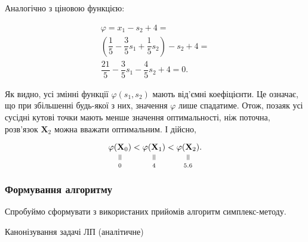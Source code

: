 \documentclass[\main/book.tex]{subfiles}
\begin{document}
Аналогічно з ціновою функцією:

\[
\begin{split}
 \varphi = x_1 - s_2 + 4 = \\
 \left( \dfrac{1}{5} - \dfrac{3}{5}s_1 + \dfrac{1}{5}s_2 \right) - s_2 + 4 = \\
 \dfrac{21}{5} - \dfrac{3}{5} s_1 - \dfrac{4}{5} s_2 + 4 = 0
 \text{.}
\end{split}
\]

Як видно, усі змінні функції $\varphi(s_1, s_2)$ мають від'ємні коефіцієнти. Це означає, що при збільшенні будь-якої з них, значення $\varphi$ лише спадатиме. Отож, позаяк усі сусідні кутові точки мають менше значення оптимальності, ніж поточна, розв'язок $\mathbf{X}_2$ можна вважати оптимальним. І дійсно,

\[
 \equalto{\varphi(\mathbf{X}_0)}{0} <
 \equalto{\varphi(\mathbf{X}_1)}{4} <
 \equalto{\varphi(\mathbf{X}_2)}{5.6}
 \text{.}
\]

\subsubsection{Формування алгоритму}

Спробуймо сформувати з використаних прийомів алгоритм симплекс-методу.

\begin{algorithm}
\caption{Канонізування задачі ЛП (аналітичне)}
\label{alg:simplex_canonising_analytic}
\begin{algorithmic}[1]
  \State {}
 \EndFunction
\end{algorithmic}
\end{algorithm}
\end{document}

